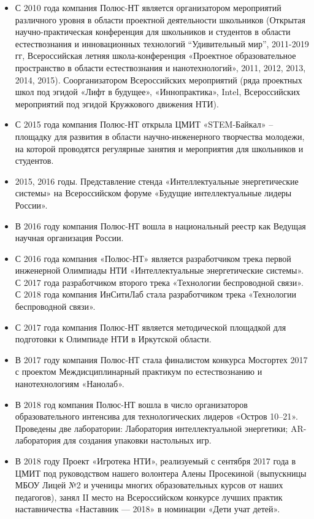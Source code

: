 \begin{itemize}
    \item С 2010 года компания Полюс-НТ является организатором мероприятий различного уровня в области проектной деятельности школьников (Открытая научно-практическая конференция для школьников и студентов в области естествознания и инновационных технологий “Удивительный мир”, 2011-2019 гг, Всероссийская летняя школа-конференция «Проектное образовательное пространство в области естествознания и нанотехнологий», 2011, 2012, 2013, 2014, 2015). Соорганизатором Всероссийских мероприятий (ряда проектных школ под эгидой «Лифт в будущее», «Иннопрактика», Intel, Всероссийских мероприятий под эгидой Кружкового движения НТИ).
    \item С 2015 года компания Полюс-НТ открыла ЦМИТ «STEM-Байкал» – площадку для развития в области научно-инженерного творчества молодежи, на которой проводятся регулярные занятия и мероприятия для школьников и студентов.
    \item 2015, 2016 годы. Представление стенда «Интеллектуальные энергетические системы» на Всероссийском форуме «Будущие интеллектуальные лидеры России».
    \item В 2016 году компания Полюс-НТ вошла в национальный реестр как Ведущая научная организация России.
    \item С 2016 года компания «Полюс-НТ» является разработчиком трека первой инженерной Олимпиады НТИ «Интеллектуальные энергетические системы». С 2017 года разработчиком второго трека «Технологии беспроводной связи». С 2018 года компания ИнСитиЛаб стала разработчиком трека «Технологии беспроводной связи».
    \item С 2017 года компания Полюс-НТ является методической площадкой для подготовки к Олимпиаде НТИ в Иркутской области.
    \item В 2017 году компания Полюс-НТ стала финалистом конкурса Мосгортех 2017 с проектом Междисциплинарный практикум по естествознанию и нанотехнологиям «Нанолаб».
    \item В 2018 год компания Полюс-НТ вошла в число организаторов образовательного интенсива для технологических лидеров «Остров 10–21». Проведены две лаборатории: Лаборатория интеллектуальной энергетики; AR-лаборатория для создания упаковки настольных игр.
    \item В 2018 году Проект «Игротека НТИ», реализуемый с сентября 2017 года в ЦМИТ под руководством нашего волонтера Алены Просекиной (выпускницы МБОУ Лицей №2 и ученицы многих образовательных курсов от наших педагогов), занял II место на Всероссийском конкурсе лучших практик наставничества «Наставник — 2018» в номинации «Дети учат детей».
\end{itemize}

